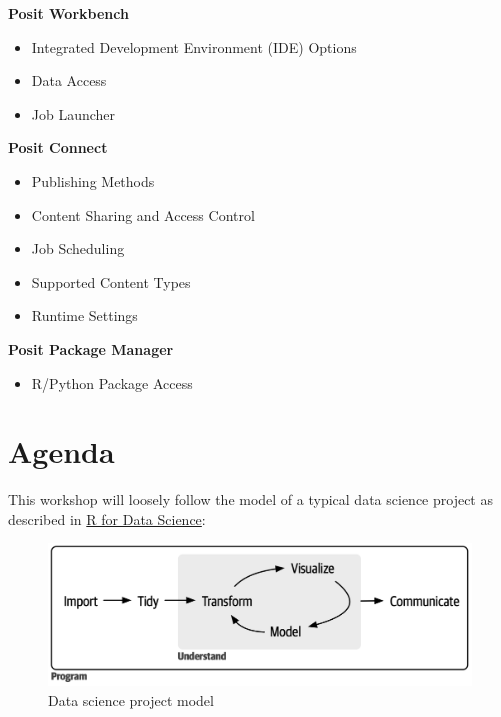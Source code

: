 \documentclass[
  letterpaper,
  DIV=11,
  numbers=noendperiod]{scrreprt}
\providecommand{\tightlist}{%
  \setlength{\itemsep}{0pt}\setlength{\parskip}{0pt}}\usepackage{longtable,booktabs,array}
\begin{document}
\textbf{Posit Workbench}

\begin{itemize}
\item
  Integrated Development Environment (IDE) Options
\item
  Data Access
\item
  Job Launcher
\end{itemize}

\textbf{Posit Connect}

\begin{itemize}
\item
  Publishing Methods
\item
  Content Sharing and Access Control
\item
  Job Scheduling
\item
  Supported Content Types
\item
  Runtime Settings
\end{itemize}

\textbf{Posit Package Manager}

\begin{itemize}
\tightlist
\item
  R/Python Package Access
\end{itemize}

\section*{Agenda}\label{agenda}


This workshop will loosely follow the model of a typical data science
project as described in \href{https://r4ds.hadley.nz/}{R for Data
Science}:

\begin{figure}

{\centering \includegraphics{images/data-science-model.png}

}

\caption{Data science project model}

\end{figure}%
\end{document}
